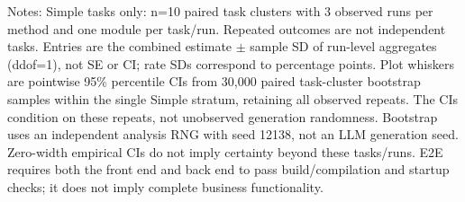\par\smallskip
\begin{minipage}{\linewidth}
\footnotesize Notes: Simple tasks only: n=10 paired task clusters with 3 observed runs per method and one module per task/run. Repeated outcomes are not independent tasks. Entries are the combined estimate $\pm$ sample SD of run-level aggregates (ddof=1), not SE or CI; rate SDs correspond to percentage points. Plot whiskers are pointwise 95\% percentile CIs from 30,000 paired task-cluster bootstrap samples within the single Simple stratum, retaining all observed repeats. The CIs condition on these repeats, not unobserved generation randomness. Bootstrap uses an independent analysis RNG with seed 12138, not an LLM generation seed. Zero-width empirical CIs do not imply certainty beyond these tasks/runs. E2E requires both the front end and back end to pass build/compilation and startup checks; it does not imply complete business functionality.
\end{minipage}
